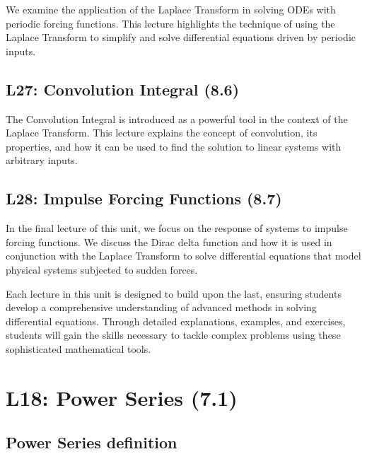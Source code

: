 \documentclass[
  letterpaper,
  DIV=11,
  numbers=noendperiod]{scrreprt}
\theoremstyle{plain}
\theoremstyle{remark}
\begin{document}

We examine the application of the Laplace Transform in solving ODEs with
periodic forcing functions. This lecture highlights the technique of
using the Laplace Transform to simplify and solve differential equations
driven by periodic inputs.

\section*{L27: Convolution Integral
(8.6)}\label{l27-convolution-integral-8.6}


The Convolution Integral is introduced as a powerful tool in the context
of the Laplace Transform. This lecture explains the concept of
convolution, its properties, and how it can be used to find the solution
to linear systems with arbitrary inputs.

\section*{L28: Impulse Forcing Functions
(8.7)}\label{l28-impulse-forcing-functions-8.7}


In the final lecture of this unit, we focus on the response of systems
to impulse forcing functions. We discuss the Dirac delta function and
how it is used in conjunction with the Laplace Transform to solve
differential equations that model physical systems subjected to sudden
forces.

Each lecture in this unit is designed to build upon the last, ensuring
students develop a comprehensive understanding of advanced methods in
solving differential equations. Through detailed explanations, examples,
and exercises, students will gain the skills necessary to tackle complex
problems using these sophisticated mathematical tools.


\chapter{L18: Power Series (7.1)}\label{l18-power-series-7.1-1}

\section{Power Series definition}\label{power-series-definition}
\end{document}
